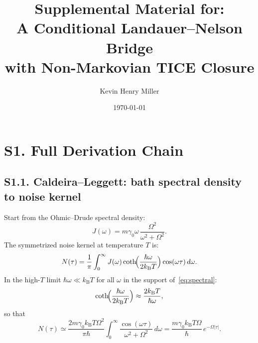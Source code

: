 \documentclass[twocolumn,showpacs,preprintnumbers,amsmath,amssymb]{revtex4-2}
\newcommand{\kB}{k_{\mathrm{B}}}
\begin{document}
\title{Supplemental Material for:\\
A Conditional Landauer--Nelson Bridge\\
with Non-Markovian TICE Closure}

\author{Kevin Henry Miller}
\noaffiliation

\date{\today}

\maketitle

\section{S1. Full Derivation Chain}
\label{sec:derivation}

\subsection{S1.1. Caldeira--Leggett: bath spectral density to noise kernel}

Start from the Ohmic--Drude spectral density:
\begin{equation}
  J(\omega) = m\gamma_0 \omega \,
  \frac{\Omega^2}{\omega^2 + \Omega^2} .
  \label{eq:spectral}
\end{equation}
The symmetrized noise kernel at temperature $T$ is:
\begin{equation}
  N(\tau) = \frac{1}{\pi}\int_0^\infty
  J(\omega)\coth\!\Bigl(\frac{\hbar\omega}{2\kB T}\Bigr)
  \cos(\omega\tau)\,d\omega .
  \label{eq:Nfull}
\end{equation}
In the high-$T$ limit $\hbar\omega \ll \kB T$ for all
$\omega$ in the support of~\eqref{eq:spectral}:
\begin{equation}
  \coth\!\Bigl(\frac{\hbar\omega}{2\kB T}\Bigr)
  \approx \frac{2\kB T}{\hbar\omega} ,
\end{equation}
so that
\begin{equation}
  N(\tau) \simeq \frac{2m\gamma_0\kB T\Omega^2}{\pi\hbar}
  \int_0^\infty
  \frac{\cos(\omega\tau)}{\omega^2 + \Omega^2}\,d\omega
  = \frac{m\gamma_0\kB T\Omega}{\hbar}\,e^{-\Omega|\tau|} .
  \label{eq:Nhigh}
\end{equation}
\end{document}
